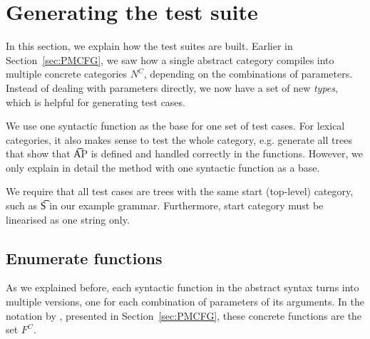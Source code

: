 


\section{Generating the test suite}
\label{sec:testing}

In this section, we explain how the test suites are built.  Earlier in
Section~\ref{sec:PMCFG}, we saw how a single abstract category
compiles into multiple concrete categories $N^C$, depending on the
combinations of parameters. Instead of dealing with parameters
directly, we now have a set of new \emph{types}, which is helpful for
generating test cases.

We use one syntactic function as the base for one set of test
cases. For lexical categories, it also makes sense to test the whole
category, e.g. generate all trees that show that \t{AP} is defined and
handled correctly in the functions. However, we only explain in detail
the method with one syntactic function as a base.

We require that all test cases are trees with the same start
(top-level) category, such as \t{S} in our example
grammar. Furthermore, start category must be linearised as one string
only.



\subsection{Enumerate functions} As we explained before, each
syntactic function in the abstract syntax turns into multiple
versions, one for each combination of parameters of its arguments.  In
the notation by \citet{angelov2010phd}, presented in
Section~\ref{sec:PMCFG}, these concrete functions are the set $F^C$.

